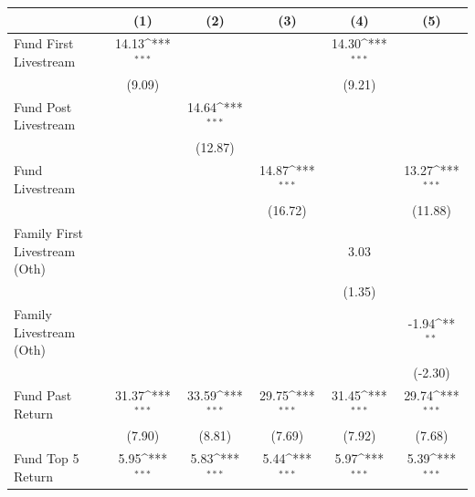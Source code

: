 {
\def\sym#1{\ifmmode^{#1}\else\(^{#1}\)\fi}
\begin{tabular}{l*{5}{c}}
\toprule
                    &\multicolumn{1}{c}{(1)}         &\multicolumn{1}{c}{(2)}         &\multicolumn{1}{c}{(3)}         &\multicolumn{1}{c}{(4)}         &\multicolumn{1}{c}{(5)}         \\
\midrule
Fund First Livestream&       14.13\sym{***}&                     &                     &       14.30\sym{***}&                     \\
                    &      (9.09)         &                     &                     &      (9.21)         &                     \\
\addlinespace
Fund Post Livestream&                     &       14.64\sym{***}&                     &                     &                     \\
                    &                     &     (12.87)         &                     &                     &                     \\
\addlinespace
Fund Livestream     &                     &                     &       14.87\sym{***}&                     &       13.27\sym{***}\\
                    &                     &                     &     (16.72)         &                     &     (11.88)         \\
\addlinespace
Family First Livestream (Oth)&                     &                     &                     &        3.03         &                     \\
                    &                     &                     &                     &      (1.35)         &                     \\
\addlinespace
Family Livestream (Oth)&                     &                     &                     &                     &       -1.94\sym{**} \\
                    &                     &                     &                     &                     &     (-2.30)         \\
\addlinespace
Fund Past Return    &       31.37\sym{***}&       33.59\sym{***}&       29.75\sym{***}&       31.45\sym{***}&       29.74\sym{***}\\
                    &      (7.90)         &      (8.81)         &      (7.69)         &      (7.92)         &      (7.68)         \\
\addlinespace
Fund Top 5 Return   &        5.95\sym{***}&        5.83\sym{***}&        5.44\sym{***}&        5.97\sym{***}&        5.39\sym{***}\\

\end{tabular}}

